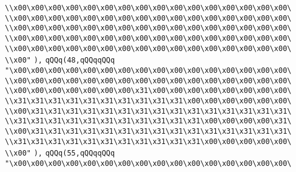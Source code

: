 \verb|\\x00\x00\x00\x00\x00\x00\x00\x00\x00\x00\x00\x00\x00\x00\x00\x00\|\newline
\verb|\\x00\x00\x00\x00\x00\x00\x00\x00\x00\x00\x00\x00\x00\x00\x00\x00\|\newline
\verb|\\x00\x00\x00\x00\x00\x00\x00\x00\x00\x00\x00\x00\x00\x00\x00\x00\|\newline
\verb|\\x00\x00\x00\x00\x00\x00\x00\x00\x00\x00\x00\x00\x00\x00\x00\x00\|\newline
\verb|\\x00\x00\x00\x00\x00\x00\x00\x00\x00\x00\x00\x00\x00\x00\x00\x00\|\newline
\verb|\\x00"|\newline
\verb|),|\newline
\verb|qQQq(48,qQQqqQQq|\newline
\verb|"\x00\x00\x00\x00\x00\x00\x00\x00\x00\x00\x00\x00\x00\x00\x00\x00\|\newline
\verb|\\x00\x00\x00\x00\x00\x00\x00\x00\x00\x00\x00\x00\x00\x00\x00\x00\|\newline
\verb|\\x00\x00\x00\x00\x00\x00\x00\x31\x00\x00\x00\x00\x00\x00\x00\x00\|\newline
\verb|\\x31\x31\x31\x31\x31\x31\x31\x31\x31\x31\x00\x00\x00\x00\x00\x00\|\newline
\verb|\\x00\x31\x31\x31\x31\x31\x31\x31\x31\x31\x31\x31\x31\x31\x31\x31\|\newline
\verb|\\x31\x31\x31\x31\x31\x31\x31\x31\x31\x31\x31\x00\x00\x00\x00\x31\|\newline
\verb|\\x00\x31\x31\x31\x31\x31\x31\x31\x31\x31\x31\x31\x31\x31\x31\x31\|\newline
\verb|\\x31\x31\x31\x31\x31\x31\x31\x31\x31\x31\x31\x00\x00\x00\x00\x00\|\newline
\verb|\\x00"|\newline
\verb|),|\newline
\verb|qQQq(55,qQQqqQQq|\newline
\verb|"\x00\x00\x00\x00\x00\x00\x00\x00\x00\x00\x00\x00\x00\x00\x00\x00\|\newline
